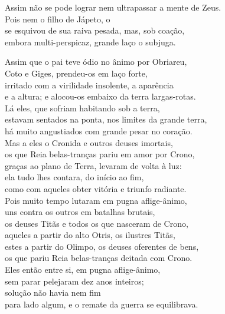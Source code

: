 \begin{pages}
\begin{Rightside}
\quad{}Assim não se pode lograr nem ultrapassar a mente de Zeus.\\
Pois nem o filho de Jápeto, o \\
se esquivou de sua raiva pesada, mas, sob coação, \\
embora multi-perspicaz, grande laço o subjuga.\\

\smallskip
\begin{center}\end{center}
\smallskip


Assim que o pai teve ódio no ânimo por Obriareu,\\
Coto e Giges, prendeu-os em laço forte,\\
irritado com a virilidade insolente, a aparência\\
e a altura; e alocou-os embaixo da terra largas-rotas. \\
Lá eles, que sofriam habitando sob a terra,\\
estavam sentados na ponta, nos limites da grande terra,\\
há muito angustiados com grande pesar no coração.\\
Mas a eles o Cronida e outros deuses imortais,\\
os que Reia belas-tranças pariu em amor por Crono, \\
graças ao plano de Terra, levaram de volta à luz:\\
ela tudo lhes contara, do início ao fim,\\
como com aqueles obter vitória e triunfo radiante.\\
Pois muito tempo lutaram em pugna aflige-ânimo,\\
uns contra os outros em batalhas brutais, \\
os deuses Titãs e todos os que nasceram de Crono, \\
aqueles a partir do alto Otris, os ilustres Titãs, \\
estes a partir do Olimpo, os deuses oferentes de bens,\\
os que pariu Reia belas-tranças deitada com Crono.\\
Eles então entre si, em pugna aflige-ânimo, \\
sem parar pelejaram dez anos inteiros;\\
solução não havia  nem fim\\
para lado algum, e o remate da guerra se equilibrava.\\


\end{Rightside}
\end{pages}
